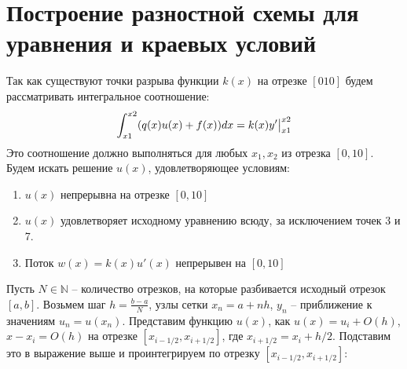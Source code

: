 \documentclass[titlepage]{article}
\begin{document}
\section{Построение разностной схемы для уравнения и краевых условий}
Так как существуют точки разрыва функции $k(x)$ на отрезке $[0 10]$ будем рассматривать интегральное соотношение: 
\begin{gather}
	\notag \int_{x1}^{x2}(q(x)u(x) + f(x))dx = k(x)y'\big|_{x1}^{x2} \\
\end{gather}
Это соотношение должно выполняться для любых $x_1, x_2$ из отрезка $[0, 10]$. Будем искать решение $u(x)$, удовлетворяющее условиям:
\begin{enumerate}
	 \item{ $u(x)$ непрерывна на отрезке $[0, 10]$}
	\item{ $u(x)$ удовлетворяет исходному уравнению всюду, за исключением точек 3 и 7.}
	\item{ Поток $w(x) = k(x)u'(x)$ непрерывен на $[0, 10]$}
\end{enumerate}
Пусть $N \in \mathbb{N}$ -- количество отрезков, на которые разбивается исходный отрезок $[a,b]$. Возьмем шаг $h=\frac{b-a}{N}$, узлы сетки $x_n = a + nh$, $y_n$ -- приближение к значениям $u_n = u(x_n)$. Представим функцию $u(x)$, как $u(x) = u_i + O(h)$, $x - x_i=O(h)$ на отрезке $[x_{i - 1/2},x_{i + 1/2}]$, где $x_{i + 1/2} = x_i + h/2$. Подставим это в выражение выше и проинтегрируем по отрезку $[x_{i - 1/2}, x_{i + 1/2}]$:
\end{document}
